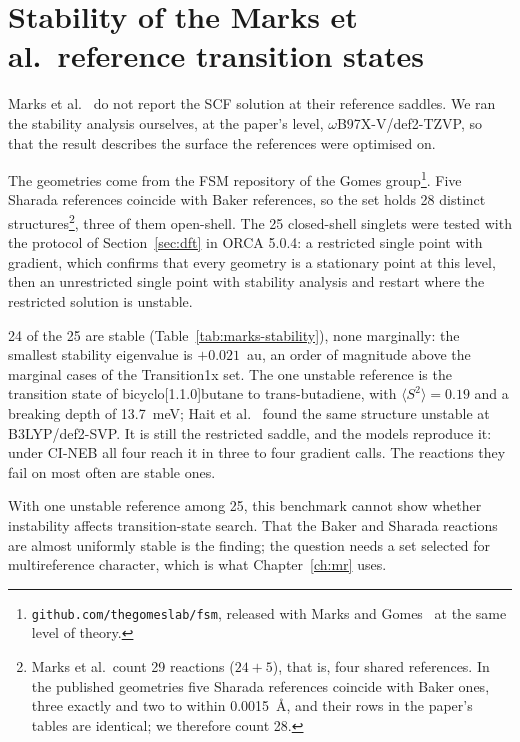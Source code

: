 
\appendix
\chapter{Stability of the Marks et al.\ reference transition states}
\label{app:marks}

Marks et al.~\cite{marks2026} do not report the SCF solution at their
reference saddles. We ran the stability analysis ourselves, at the
paper's level, \mbox{$\omega$B97X-V/def2-TZVP}, so that the result
describes the surface the references were optimised on.

The geometries come from the FSM repository of the Gomes
group\footnote{\texttt{github.com/thegomeslab/fsm}, released with
Marks and Gomes~\cite{marks2024fsm} at the same level of theory.}. Five Sharada
references coincide with Baker references, so the set holds 28
distinct structures\footnote{Marks et al.\ count 29 reactions
($24 + 5$), that is, four shared references. In the published
geometries five Sharada references coincide with Baker ones, three
exactly and two to within 0.0015~\AA, and their rows in the paper's
tables are identical; we therefore count 28.}, three of them
open-shell. The 25 closed-shell
singlets were tested with the protocol of Section~\ref{sec:dft} in
ORCA 5.0.4: a restricted single point with gradient, which confirms
that every geometry is a stationary point at this level, then an
unrestricted single point with stability analysis and restart where
the restricted solution is unstable.

24 of the 25 are stable (Table~\ref{tab:marks-stability}), none marginally: the smallest stability
eigenvalue is $+0.021$~au, an order of magnitude above the marginal
cases of the Transition1x set. The one unstable reference is the
transition state of bicyclo[1.1.0]butane to trans-butadiene, with
$\langle S^2\rangle = 0.19$ and a breaking depth of 13.7~meV; Hait et
al.~\cite{hait2025} found the same structure unstable at
B3LYP/def2-SVP. It is still the restricted saddle, and the models
reproduce it: under CI-NEB all four reach it in three to four gradient
calls. The reactions they fail on most often are stable ones.

With one unstable reference among 25, this benchmark cannot show
whether instability affects transition-state search. That the Baker
and Sharada reactions are almost uniformly stable is the finding; the
question needs a set selected for multireference character, which is
what Chapter~\ref{ch:mr} uses.

